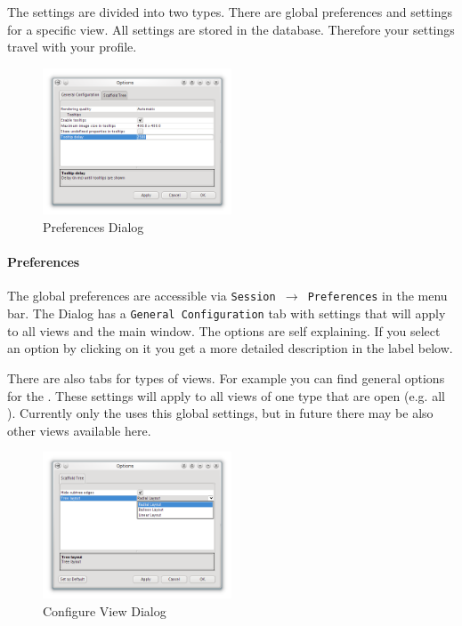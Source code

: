 The \sh settings are divided into two types. There are global preferences and settings for a specific view. All settings are stored in the database. Therefore your settings travel with your profile.

\begin{figure}[!htb]
   \centering
   \includegraphics[width=0.5\textwidth]{images/sh_preferences_dialog_generalconfiguration.png}
   \caption{Preferences Dialog}
   \label{fig:generalconfiguration}
\end{figure}
\paragraph{Preferences}
The global preferences are accessible via \texttt{Session $\rightarrow$ Preferences} in the menu bar. The Dialog  has a \texttt{General Configuration} tab with settings that will apply to all views and the main window. The options are self explaining. If you select an option by clicking on it you get a more detailed description in the label below. 

There are also tabs for types of views. For example you can find general options for the \stview. These settings will apply to all views of one type that are open (e.g. all \stviews). Currently only the \stview uses this global settings, but in future there may be also other views available here. 

\begin{figure}[!htb]
   \centering
   \includegraphics[width=0.5\textwidth]{images/sh_configure_view_dialog_scaffoldtree.png}
   \caption{Configure View Dialog}
   \label{fig:configure_view}
\end{figure}
